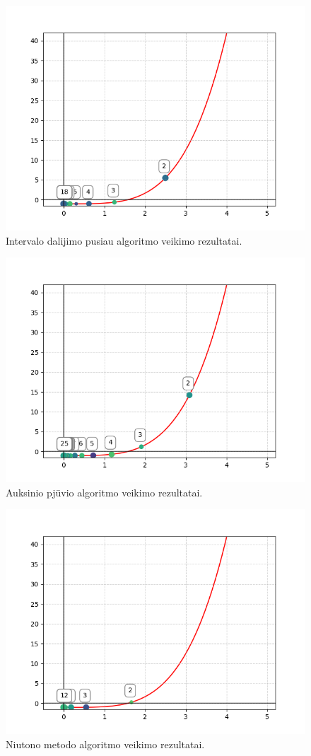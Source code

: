 \documentclass{VUMIFPSkursinis}
\begin{document}
\begin{figure}[H]
  \centering
  \includegraphics[scale=0.8]{img/bisection.png}
  \caption{Intervalo dalijimo pusiau algoritmo veikimo rezultatai.}
  \label{img:bisection}
\end{figure}

\begin{figure}[H]
  \centering
  \includegraphics[scale=0.8]{img/golden-section.png}
  \caption{Auksinio pjūvio algoritmo veikimo rezultatai.}
  \label{img:golden-section}
\end{figure}

\begin{figure}[H]
  \centering
  \includegraphics[scale=0.8]{img/newtons.png}
  \caption{Niutono metodo algoritmo veikimo rezultatai.}
  \label{img:newtons}
\end{figure}
\end{document}
